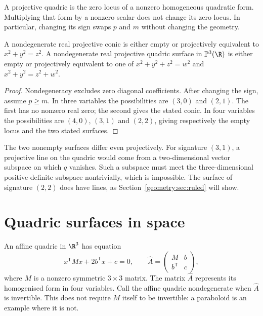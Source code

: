 A projective quadric is the zero locus of a nonzero homogeneous quadratic
form. Multiplying that form by a nonzero scalar does not change its zero
locus. In particular, changing its sign swaps $p$ and $m$ without changing
the geometry.

\begin{corollary}\label{geometry:cor:realconics}
A nondegenerate real projective conic is either empty or projectively
equivalent to $x^2+y^2=z^2$.
A nondegenerate real projective quadric surface in $\mathbb P^3(\R)$ is
either empty or projectively equivalent to one of
$x^2+y^2+z^2=w^2$ and $x^2+y^2=z^2+w^2$.
\end{corollary}
\begin{proof}
Nondegeneracy excludes zero diagonal coefficients. After changing the
sign, assume $p\ge m$. In three variables the possibilities are
$(3,0)$ and $(2,1)$. The first has no nonzero real zero; the second gives
the stated conic. In four variables the possibilities are $(4,0)$,
$(3,1)$ and $(2,2)$, giving respectively the empty locus and the two
stated surfaces.
\end{proof}

The two nonempty surfaces differ even projectively. For signature $(3,1)$,
a projective line on the quadric would come from a two-dimensional vector
subspace on which $q$ vanishes. Such a subspace must meet the
three-dimensional positive-definite subspace nontrivially, which is
impossible. The surface of signature $(2,2)$ does have lines, as
Section~\ref{geometry:sec:ruled} will show.

\section{Quadric surfaces in space}

An affine quadric in $\R^3$ has equation
\[
 x^{\mathsf T}Mx+2b^{\mathsf T}x+c=0,
 \qquad \widehat A=\begin{pmatrix}M&b\\b^{\mathsf T}&c\end{pmatrix},
\]
where $M$ is a nonzero symmetric $3\times3$ matrix.
The matrix $\widehat A$ represents its homogenised form in four variables.
Call the affine quadric nondegenerate when $\widehat A$ is invertible.
This does not require $M$ itself to be invertible: a paraboloid is an
example where it is not.

